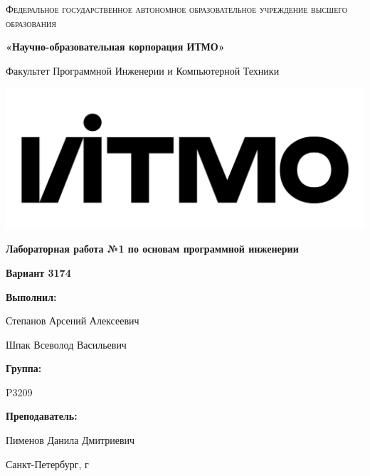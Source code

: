 \documentclass[12pt,a4paper]{article}
\begin{document}
\begin{titlepage} 
	\centering
	{
        \scshape
        Федеральное государственное автономное образовательное учреждение высшего образования
        \par
        \textbf{«Научно-образовательная корпорация ИТМО»}
        \par
        \vspace{1cm}
        Факультет Программной Инженерии и Компьютерной Техники
        \par
    }
    \vspace{0.6cm}
    \includegraphics[width=\textwidth]{logo.png}
    {
        \Large
        \textbf{Лабораторная работа №1 по основам программной инженерии}
        \par
        \normalsize
        \vspace{0.75cm}
        \textbf{Вариант 3174}
        \par
    }
    \vfill
    \hfill\begin{minipage}{\dimexpr\textwidth-7.8cm}
        \textbf{Выполнил:}\par
        Степанов Арсений Алексеевич\par
        Шпак Всеволод Васильевич\par
        \vspace{0.15cm}
        \textbf{Группа:}\par
        P3209\par
        \vspace{0.15cm}
        \textbf{Преподаватель:}\par
        Пименов Данила Дмитриевич\par
    \end{minipage}
    \vfill
    Санкт-Петербург, \the\year{}г
\end{titlepage}  
\end{document}
